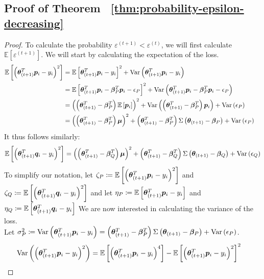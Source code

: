 \documentclass{article} %
\begin{document}
\begin{appendices}
	\subsection{Proof of Theorem ~\ref{thm:probability-epsilon-decreasing}}
	\label{app:decrease-of-epsilon}
	\begin{proof}
		To calculate the probability $\varepsilon^{(t+1)} < \varepsilon^{(t)}$, we will first calculate $\mathbb{E}\left[\varepsilon^{(t+1)}\right]$. We will start by calculating the expectation of the loss. 
		\begin{align*}
			\mathbb{E}\left[\left({\bm{\theta}}_{(t+1)}^T{\bm{p}}_i - y_i\right)^2\right] &= \mathbb{E}\left[{\bm{\theta}}_{(t+1)}^T{\bm{p}}_i - y_i\right]^2 + \mathrm{Var}\left({\bm{\theta}}_{(t+1)}^T{\bm{p}}_i - y_i\right) &&\\
			&= \mathbb{E}\left[{\bm{\theta}}_{(t+1)}^T{\bm{p}}_i - {\bm{\beta}}_P^T{\bm{p}}_i - {\epsilon}_P\right]^2 + \mathrm{Var}\left({\bm{\theta}}_{(t+1)}^T{\bm{p}}_i - {\bm{\beta}}_P^T{\bm{p}}_i - {\epsilon}_P\right) &&\\
			&= \left(\left({\bm{\theta}}^T_{(t+1)} - {\bm{\beta}}_P^T\right)\mathbb{E}\left[{\bm{p}}_i\right]\right)^2 + \mathrm{Var}\left(\left({\bm{\theta}}^T_{(t+1)}-{\bm{\beta}}_P^T\right){\bm{p}}_i\right) + \mathrm{Var}\left({\epsilon}_P\right)	&&\\	
			&= \left(\left({\bm{\theta}}^T_{(t+1)}-{\bm{\beta}}_P^T\right){\bm{\mu}}\right)^2 + \left({\bm{\theta}}^T_{(t+1)} - {\bm{\beta}}_P^T\right)\Sigma\left({\bm{\theta}}_{(t+1)} - {\bm{\beta}}_P\right) + \mathrm{Var}\left({\epsilon}_P\right)
		\end{align*}
		It thus follows similarly:
		\begin{equation*}
			\mathbb{E}\left[\left({\bm{\theta}}_{(t+1)}^T{\bm{q}}_i - y_i\right)^2\right] =  \left(\left({\bm{\theta}}^T_{(t+1)}-{\bm{\beta}}_Q^T\right){\bm{\mu}}\right)^2 + \left({\bm{\theta}}^T_{(t+1)} - {\bm{\beta}}_Q^T\right)\Sigma\left({\bm{\theta}}_{(t+1)} - {\bm{\beta}}_Q\right) + \mathrm{Var}\left({\epsilon}_Q\right)
		\end{equation*}
		To simplify our notation, let $\zeta_P \coloneqq \mathbb{E}\left[\left({\bm{\theta}}_{(t+1)}^T{\bm{p}}_i - y_i\right)^2\right]$ and $\zeta_Q \coloneqq \mathbb{E}\left[\left({\bm{\theta}}_{(t+1)}^T{\bm{q}}_i - y_i\right)^2\right]$ and let $\eta_P \coloneqq \mathbb{E}\left[{\bm{\theta}}_{(t+1)}^T{\bm{p}}_i - y_i\right]$ and $\eta_Q \coloneqq \mathbb{E}\left[{\bm{\theta}}_{(t+1)}^T{\bm{q}}_i - y_i\right]$
		We are now interested in calculating the variance of the loss. \\
		Let $\sigma^2_P \coloneqq \mathrm{Var}\left({\bm{\theta}}^T_{(t+1)}{\bm{p}}_i - y_i\right) = \left({\bm{\theta}}^T_{(t+1)} - {\bm{\beta}}_P^T\right)\Sigma\left({\bm{\theta}}_{(t+1)} - {\bm{\beta}}_P\right) + \mathrm{Var}\left({\epsilon}_P\right)$. 
		\begin{align*}
			\Var\left(\left(\vtheta_{(t+1)}^T\vp_i - y_i\right)^2\right)&= \mathbb{E}\left[\left(\vtheta_{(t+1)}^T\vp_i - y_i\right)^4\right] - \mathbb{E}\left[\left(\vtheta_{(t+1)}^T\vp_i - y_i\right)^2\right]^2 &&\\

\end{align*}
\end{proof}
\end{appendices}
\end{document}
